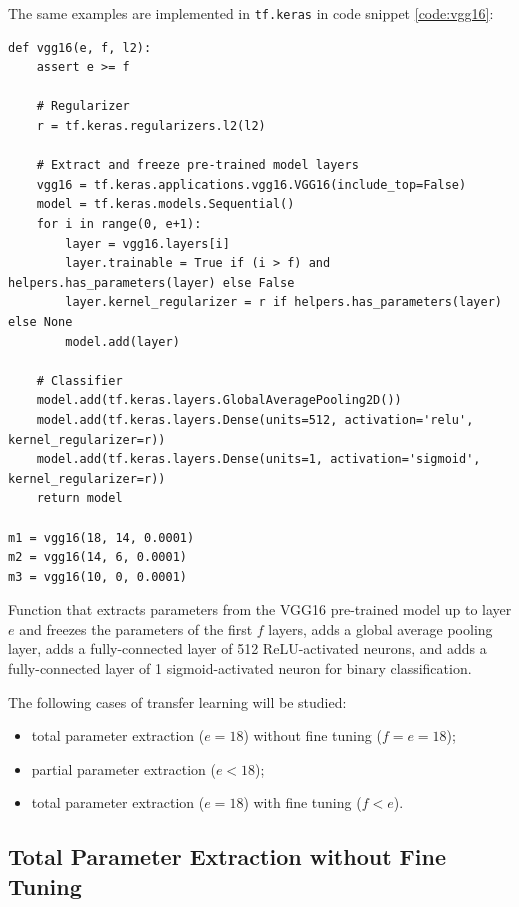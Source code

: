 The same examples are implemented in \verb|tf.keras| in code snippet \ref{code:vgg16}:

\begin{listing}[ht]
\begin{verbatim}
def vgg16(e, f, l2):
    assert e >= f

    # Regularizer
    r = tf.keras.regularizers.l2(l2)

    # Extract and freeze pre-trained model layers
    vgg16 = tf.keras.applications.vgg16.VGG16(include_top=False)
    model = tf.keras.models.Sequential()
    for i in range(0, e+1):
        layer = vgg16.layers[i]
        layer.trainable = True if (i > f) and helpers.has_parameters(layer) else False
        layer.kernel_regularizer = r if helpers.has_parameters(layer) else None
        model.add(layer)

    # Classifier
    model.add(tf.keras.layers.GlobalAveragePooling2D())
    model.add(tf.keras.layers.Dense(units=512, activation='relu', kernel_regularizer=r))
    model.add(tf.keras.layers.Dense(units=1, activation='sigmoid', kernel_regularizer=r))
    return model

m1 = vgg16(18, 14, 0.0001)
m2 = vgg16(14, 6, 0.0001)
m3 = vgg16(10, 0, 0.0001)
\end{verbatim}
\caption{Function that extracts parameters from the VGG16 pre-trained model up to layer $e$ and freezes the parameters of the first $f$ layers, adds a global average pooling layer, adds a fully-connected layer of 512 ReLU-activated neurons, and adds a fully-connected layer of 1 sigmoid-activated neuron for binary classification.}
\label{code:vgg16}
\end{listing}

The following cases of transfer learning will be studied:

\begin{itemize}
    \item total parameter extraction ($e = 18$) without fine tuning ($f = e = 18$);
    \item partial parameter extraction ($e < 18$);
    \item total parameter extraction ($e = 18$) with fine tuning ($f < e$).
\end{itemize}

\subsection{Total Parameter Extraction without Fine Tuning}
\label{section:total_parameter_extraction_without_fine_tuning}

